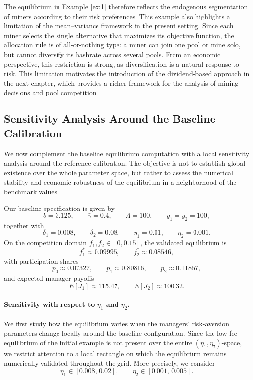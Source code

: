 The equilibrium in Example \ref{ex:1} therefore reflects the endogenous segmentation of miners according to their risk preferences. This example also highlights a limitation of the mean--variance framework in the present setting. Since each miner selects the single alternative that maximizes its objective function, the allocation rule is of all-or-nothing type: a miner can join one pool or mine solo, but cannot diversify its hashrate across several pools. From an economic perspective, this restriction is strong, as diversification is a natural response to risk. This limitation motivates the introduction of the dividend-based approach in the next chapter, which provides a richer framework for the analysis of mining decisions and pool competition.

\subsection{Sensitivity Analysis Around the Baseline Calibration}

We now complement the baseline equilibrium computation with a local sensitivity analysis around the reference calibration. The objective is not to establish global existence over the whole parameter space, but rather to assess the numerical stability and economic robustness of the equilibrium in a neighborhood of the benchmark values.

Our baseline specification is given by
\[
b=3.125,\qquad \bar{\gamma}=0.4,\qquad \Lambda=100,\qquad y_1=y_2=100,
\]
together with
\[
\delta_1=0.008,\qquad \delta_2=0.08,\qquad \eta_1=0.01,\qquad \eta_2=0.001.
\]
On the competition domain \(f_1,f_2\in[0,0.15]\), the validated equilibrium is
\[
f_1^*\approx 0.09995,\qquad f_2^*\approx 0.08546,
\]
with participation shares
\[
p_0\approx 0.07327,\qquad p_1\approx 0.80816,\qquad p_2\approx 0.11857,
\]
and expected manager payoffs
\[
E[J_1]\approx 115.47,\qquad E[J_2]\approx 100.32.
\]

\paragraph{Sensitivity with respect to \(\eta_1\) and \(\eta_2\).}

We first study how the equilibrium varies when the managers' risk-aversion parameters change locally around the baseline configuration. Since the low-fee equilibrium of the initial example is not present over the entire \((\eta_1,\eta_2)\)-space, we restrict attention to a local rectangle on which the equilibrium remains numerically validated throughout the grid. More precisely, we consider
\[
\eta_1 \in [0.008,\,0.02],\qquad \eta_2 \in [0.001,\,0.005].
\]

